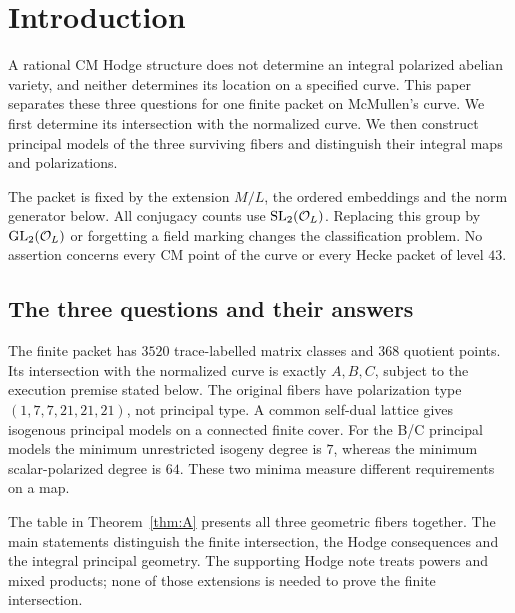 \section{Introduction}\label{sec:intro}
A rational CM Hodge structure does not determine an integral polarized
abelian variety, and neither determines its location on a specified curve.
This paper separates these three questions for one finite packet on
McMullen's curve. We first determine its intersection with the normalized
curve. We then construct principal models of the three surviving fibers
and distinguish their integral maps and polarizations.

The packet is fixed by the extension $M/L$, the ordered embeddings and the
norm generator below. All conjugacy counts use $\operatorname{SL}_2(\mathcal O_L)$.
Replacing this group by $\operatorname{GL}_2(\mathcal O_L)$ or forgetting a field marking
changes the classification problem. No assertion concerns every CM point
of the curve or every Hecke packet of level $43$.

\subsection{The three questions and their answers}
The finite packet has $3520$ trace-labelled matrix classes and $368$
quotient points. Its intersection with the normalized curve is exactly
$A,B,C$, subject to the execution premise stated below. The original
fibers have polarization type $(1,7,7,21,21,21)$, not principal type.
A common self-dual lattice gives isogenous principal models on a connected
finite cover. For the B/C principal models the minimum unrestricted
isogeny degree is $7$, whereas the minimum scalar-polarized degree is $64$.
These two minima measure different requirements on a map.

The table in Theorem~\ref{thm:A} presents all three geometric fibers
together. The main statements distinguish the finite intersection, the
Hodge consequences and the integral principal geometry. The supporting
Hodge note treats powers and mixed products; none of those extensions is
needed to prove the finite intersection.

